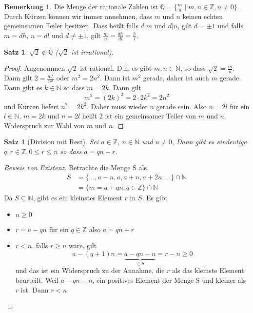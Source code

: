 \documentclass{article}
\theoremstyle{definition}
\newtheorem{bem}[definition]{Bemerkung}
\theoremstyle{plain}
\newtheorem{sa}[definition]{Satz}
\begin{document}
\begin{bem}
	Die Menge der rationale Zahlen ist
	$ \mathbb{Q} = \{ \frac{m}{n} \mid m,n \in \mathbb{Z}, n \neq 0 \} $. Durch Kürzen können wir immer annehmen, dass $ m $ und $ n $ keinen echten gemeinsamen Teiler besitzen. Dass heißt falls 
	$ d|m $ und $ d|n $, gilt $ d = \pm 1 $ und falls $ m=dh $, $ n=dl $ und $ d \neq \pm 1 $, gilt 
	$ \frac{m}{n} = \frac{dh}{dl} = \frac{h}{l} $.
\end{bem}
\begin{sa}
	$\sqrt{2} \notin \mathbb{Q} $ ($ \sqrt{2} $ ist irrational).
\end{sa}
\begin{proof}
	Angenommen $ \sqrt{2} $ ist rational. D.h. es gibt $ m,n \in \mathbb{N} $, so dass $ \sqrt{2} = \frac{m}{n} $. Dann gilt $ 2 = \frac{m^2}{n^2} $ oder $ m^2 = 2n^2 $. Dann ist $ m^2 $ gerade, daher ist auch $ m $ gerade. Dann gibt es $ k \in \mathbb{N} $ so dass $ m = 2k $. Dann gilt
	\[ 
	m^2 = (2k)^2 = 2\cdot 2k^2 = 2n^2
	 \]
	 und Kürzen liefert $ n^2 = 2k^2 $. Daher muss wieder $ n $ gerade sein. Also $ n = 2l $ für ein 
	 $ l \in \mathbb{N} $. $ m = 2k $ und $ n = 2l $ heißt $ 2 $ ist ein gemeinsamer Teiler von $ m $ und $ n $. Widerspruch zur Wahl von $ m $ und $ n $.
\end{proof}
\begin{sa}[Division mit Rest]
	Sei $ a \in \mathbb{Z} $, $ n \in \mathbb{N} $ und $ n \neq 0 $, Dann gibt es eindeutige $ q,r \in \mathbb{Z}, 0 \leq r \leq n $ so dass $ a = qn + r $.
\end{sa}
\begin{proof}[Beweis von Existenz]
	Betrachte die Menge S als
	\begin{align*}
		S & = \{ \ldots , a - n , a , a + n , a + 2n , \ldots \} \cap \mathbb{N} \\
		& = \{ m = a+qn : q \in \mathbb{Z} \} \cap \mathbb{N}
	\end{align*}
	Da $ S \subseteq \mathbb{N} $, gibt es ein kleinstes Element $ r $ in $ S $. Es gibt
	\begin{itemize}
		\item $ n \geq 0 $
		\item $ r = a - qn $ für ein $ q \in \mathbb{Z} $ also $ a = qn+r $
		\item $ r < n $. falls $ r \geq n $ wäre, gilt
		\[ 
		a - (q+1)n = \underbrace{a-qn-n}_{\in S} = r-n \geq 0
		 \]
		und das ist ein Widerspruch zu der Annahme, die $ r $ als das kleinste Element beurteilt. Weil $ a-qn-n $, ein positives Element der Menge S und kleiner als $ r $ ist. Dann $ r < n $.
	\end{itemize}
\end{proof}
\end{document}
